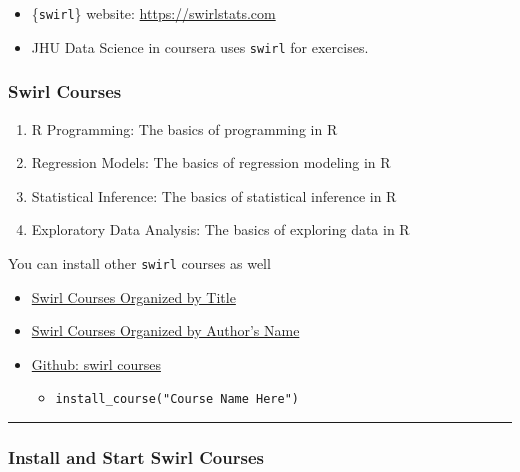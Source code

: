 \documentclass[
]{article}
\providecommand{\tightlist}{%
  \setlength{\itemsep}{0pt}\setlength{\parskip}{0pt}}
\begin{document}
\begin{itemize}
\tightlist
\item
  \{\texttt{swirl}\} website: \url{https://swirlstats.com}
\item
  JHU Data Science in coursera uses \texttt{swirl} for exercises.
\end{itemize}

\hypertarget{swirl-courses}{%
\subsubsection{Swirl Courses}\label{swirl-courses}}

\begin{enumerate}
\def\labelenumi{\arabic{enumi}.}
\tightlist
\item
  R Programming: The basics of programming in R
\item
  Regression Models: The basics of regression modeling in R
\item
  Statistical Inference: The basics of statistical inference in R
\item
  Exploratory Data Analysis: The basics of exploring data in R
\end{enumerate}

You can install other \texttt{swirl} courses as well

\begin{itemize}
\tightlist
\item
  \href{http://swirlstats.com/scn/title.html}{Swirl Courses Organized by
  Title}
\item
  \href{http://swirlstats.com/scn/surname.html}{Swirl Courses Organized
  by Author's Name}
\item
  \href{https://github.com/swirldev/swirl_courses\#swirl-courses}{Github:
  swirl courses}

  \begin{itemize}
  \tightlist
  \item
    \texttt{install\_course("Course\ Name\ Here")}
  \end{itemize}
\end{itemize}

\begin{center}\rule{0.5\linewidth}{0.5pt}\end{center}

\hypertarget{install-and-start-swirl-courses}{%
\subsubsection{Install and Start Swirl
Courses}\label{install-and-start-swirl-courses}}
\end{document}
